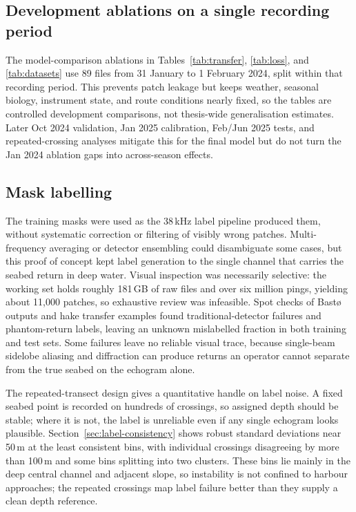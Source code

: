 \subsection{Development ablations on a single recording period}
The model-comparison ablations in Tables~\ref{tab:transfer}, \ref{tab:loss}, and \ref{tab:datasets} use 89 files from 31 January to 1 February 2024, split within that recording period. This prevents patch leakage but keeps weather, seasonal biology, instrument state, and route conditions nearly fixed, so the tables are controlled development comparisons, not thesis-wide generalisation estimates. Later Oct 2024 validation, Jan 2025 calibration, Feb/\allowbreak Jun 2025 tests, and repeated-crossing analyses mitigate this for the final model but do not turn the Jan 2024 ablation gaps into across-season effects.

\subsection{Mask labelling}
The training masks were used as the 38\,kHz label pipeline produced them, without systematic correction or filtering of visibly wrong patches. Multi-frequency averaging or detector ensembling could disambiguate some cases, but this proof of concept kept label generation to the single channel that carries the seabed return in deep water. Visual inspection was necessarily selective: the working set holds roughly 181\,GB of raw files and over six million pings, yielding about 11{,}000 patches, so exhaustive review was infeasible. Spot checks of Bast\o{} outputs and hake transfer examples found traditional-detector failures and phantom-return labels, leaving an unknown mislabelled fraction in both training and test sets. Some failures leave no reliable visual trace, because single-beam sidelobe aliasing and diffraction can produce returns an operator cannot separate from the true seabed on the echogram alone.

The repeated-transect design gives a quantitative handle on label noise. A fixed seabed point is recorded on hundreds of crossings, so assigned depth should be stable; where it is not, the label is unreliable even if any single echogram looks plausible. Section~\ref{sec:label-consistency} shows robust standard deviations near 50\,m at the least consistent bins, with individual crossings disagreeing by more than 100\,m and some bins splitting into two clusters. These bins lie mainly in the deep central channel and adjacent slope, so instability is not confined to harbour approaches; the repeated crossings map label failure better than they supply a clean depth reference.

